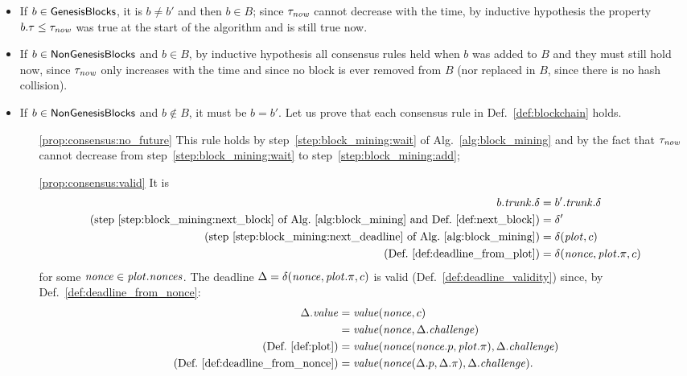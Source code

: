   \begin{itemize}
  \item If $b\in{\mathsf{GenesisBlocks}}$, it is $b\not=b'$ and then $b\in B$; since $\tau_{\mathit{now}}$
    cannot decrease with the time, by inductive hypothesis
    the property $b.\tau\le\tau_{\mathit{now}}$ was true at the start of the
    algorithm and is still true now.
  \item If $b\in{\mathsf{NonGenesisBlocks}}$ and $b\in B$, by inductive hypothesis
    all consensus rules held when $b$ was added to
    $B$ and they must still hold now, since $\tau_{\mathit{now}}$ only
    increases with the time and since no block is ever removed from $B$
    (nor replaced in $B$, since there is no hash collision).
  \item If $b\in{\mathsf{NonGenesisBlocks}}$ and $b\not\in B$, it must be $b=b'$. Let us prove that each consensus rule
    in Def.~\ref{def:blockchain} holds.
    \begin{itemize}
    \item[\ref{prop:consensus:no_future}] This rule holds by step~\ref{step:block_mining:wait} of
      Alg.~\ref{alg:block_mining} and by the fact
      that $\tau_{\mathit{now}}$ cannot decrease from step~\ref{step:block_mining:wait} to
      step~\ref{step:block_mining:add};
    \item[\ref{prop:consensus:valid}] It is
      \begin{align*}
        b.{\mathit{trunk}}.\delta&=b'.{\mathit{trunk}}.\delta\\
        \text{(step~\ref{step:block_mining:next_block} of Alg.~\ref{alg:block_mining} and Def.~\ref{def:next_block})}&=\delta'\\
        \text{(step~\ref{step:block_mining:next_deadline} of Alg.~\ref{alg:block_mining})}&=
        \delta({\mathit{plot}},c)\\
        \text{(Def.~\ref{def:deadline_from_plot})}&=\delta({\mathit{nonce}},{\mathit{plot}}.\pi,c)
      \end{align*}
      for some ${\mathit{nonce}}\in{\mathit{plot}}.{\mathit{nonces}}$. The deadline $\Delta=\delta({\mathit{nonce}},{\mathit{plot}}.\pi,c)$ is valid
      (Def.~\ref{def:deadline_validity}) since, by Def.~\ref{def:deadline_from_nonce}:
      \begin{align*}
        \Delta.\mathit{value}&=\mathit{value}(\nonce,c)\\
        &=\mathit{value}(\nonce,\Delta.\challenge)\\
        \text{(Def.~\ref{def:plot})}&=\mathit{value}(\nonce(\nonce.p,\plot.\pi),\Delta.\challenge)\\
        \text{(Def.~\ref{def:deadline_from_nonce})}&=\mathit{value}(\nonce(\Delta.p,\Delta.\pi),\Delta.\challenge).

\end{align*}
\end{itemize}
\end{itemize}

